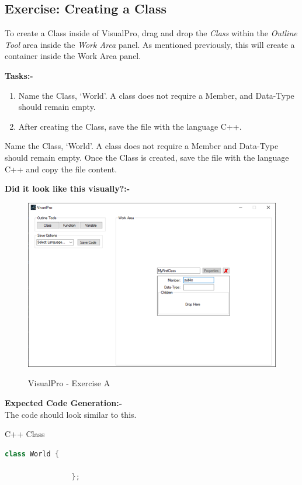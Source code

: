\documentclass[10pt]{article}
\begin{document}
    \newpage
    \subsection{Exercise: Creating a Class}
        To create a Class inside of VisualPro, drag and drop the \textit{Class} within the \textit{Outline Tool} area inside the \textit{Work Area} panel. As mentioned previously, this will create a container inside the Work Area panel.

        \textbf{Tasks:-}
        \begin{enumerate}
            \item Name the Class, `World'. A class does not require a Member, and Data-Type should remain empty.
            \item After creating the Class, save the file with the language C++.
        \end{enumerate}
        Name the Class, `World'. A class does not require a Member and Data-Type should remain empty. Once the Class is created, save the file with the language C++ and copy the file content.

        \textbf{Did it look like this visually?:-}
            \begin{figure}[h]
                \centering
                {\includegraphics[scale=0.75]{Figures/Exercises/SecB-1.png}}
                \caption{VisualPro - Exercise A}
                \label{fig:vp-eA}
            \end{figure}

        \textbf{Expected Code Generation:-}\\
        The code should look similar to this.
        \begin{example}{C++ Class}
            \begin{lstlisting}[language=c++]
                class World {

                };
            \end{lstlisting}
        \end{example}
\end{document}
